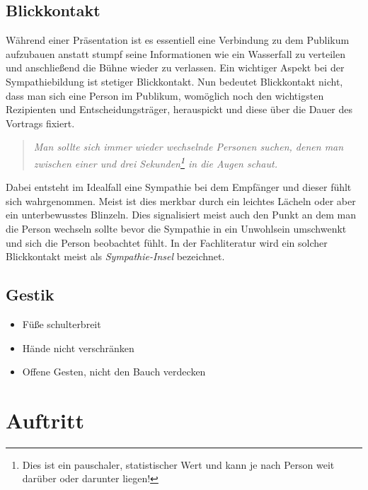 \documentclass[../main.tex]{subfiles}
\begin{document}
        \subsection{Blickkontakt}\label{section:Seminar:RhetorikI:SympathieInsel}
            Während einer Präsentation ist es essentiell eine Verbindung zu dem Publikum aufzubauen anstatt stumpf seine Informationen wie ein Wasserfall zu verteilen und anschließend die Bühne wieder zu verlassen. Ein wichtiger Aspekt bei der Sympathiebildung ist stetiger Blickkontakt. Nun bedeutet Blickkontakt nicht, dass man sich eine Person im Publikum, womöglich noch den wichtigsten Rezipienten und Entscheidungsträger, herauspickt und diese über die Dauer des Vortrags fixiert. 
            \begin{quote}
                \emph{Man sollte sich immer wieder wechselnde Personen suchen, denen man zwischen einer und drei Sekunden\footnote{Dies ist ein pauschaler, statistischer Wert und kann je nach Person weit darüber oder darunter liegen!} in die Augen schaut.}
            \end{quote}
            Dabei entsteht im Idealfall eine Sympathie bei dem Empfänger und dieser fühlt sich wahrgenommen. Meist ist dies merkbar durch ein leichtes Lächeln oder aber ein unterbewusstes Blinzeln. Dies signalisiert meist auch den Punkt an dem man die Person wechseln sollte bevor die Sympathie in ein Unwohlsein umschwenkt und sich die Person beobachtet fühlt. In der Fachliteratur wird ein solcher Blickkontakt meist als \emph{Sympathie-Insel} bezeichnet.
            
        \subsection{Gestik}
        	\begin{itemize}
        		\item Füße schulterbreit
        		\item Hände nicht verschränken
        		\item Offene Gesten, nicht den Bauch verdecken
        	\end{itemize}
            
            
    
    \section{Auftritt}
\end{document}
